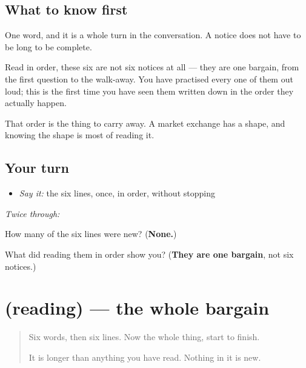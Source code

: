 \subsection*{What to know first}
\textbf{} One word, and it is a whole turn in the conversation. A notice does not have to be long to be complete.

Read in order, these six are not six notices at all — they are one bargain, from the first question to the walk-away. You have practised every one of them out loud; this is the first time you have seen them written down in the order they actually happen.

That order is the thing to carry away. A market exchange has a shape, and knowing the shape is most of reading it.

\subsection*{Your turn}
\begin{itemize}
\raggedright
  \item \emph{Say it:} the six lines, once, in order, without stopping
\end{itemize}

\emph{Twice through:}

\begin{tcolorbox}[breakable,colback=teal!4,colframe=teal!35!black,title={Before you move on}]
How many of the six lines were new? (\textbf{None.})

What did reading them in order show you? (\textbf{They are one bargain}, not six notices.)
\end{tcolorbox}
\section[(reading)]{(reading) — the whole bargain}

\label{lesson:MW-C40-pehlo-path}



\begin{quote}
Six words, then six lines. Now the whole thing, start to finish.

It is longer than anything you have read. Nothing in it is new.
\end{quote}

